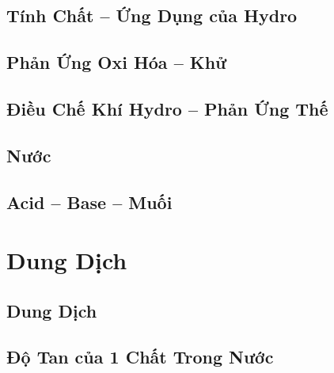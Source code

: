 \documentclass{article}
\numberwithin{equation}{section}
\begin{document}
\subsection{Tính Chất -- Ứng Dụng của Hydro}


\subsection{Phản Ứng Oxi Hóa -- Khử}


\subsection{Điều Chế Khí Hydro -- Phản Ứng Thế}


\subsection{Nước}


\subsection{Acid -- Base -- Muối}


\section{Dung Dịch}

\subsection{Dung Dịch}


\subsection{Độ Tan của 1 Chất Trong Nước}
\end{document}
